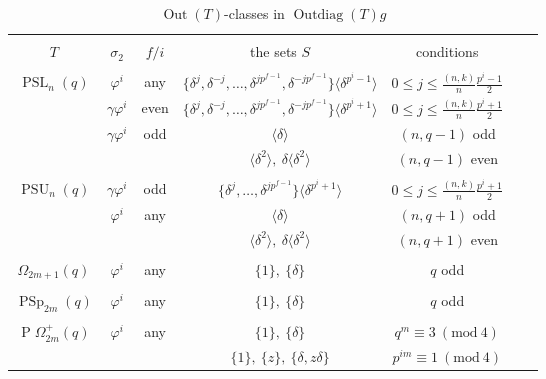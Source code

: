 \documentclass[11pt]{article}
\numberwithin{equation}{section}
\theoremstyle{shdefinition}
\theoremstyle{shplain}
\newcommand{\g}{\gamma}
\renewcommand{\d}{\delta}
\newcommand{\p}{\varphi}
\newcommand{\s}{\sigma}
\newcommand{\<}{\langle}
\renewcommand{\>}{\rangle}
\renewcommand{\leq}{\leqslant}
\newcommand{\Out}{\operatorname{Out}}
\newcommand{\Outdiag}{\operatorname{Outdiag}}
\renewcommand{\:}{\colon}
\renewcommand{\mod}[1]{\mathrm{ \ } (\mathrm{mod\ } #1)}
\newcommand{\PSL}{\operatorname{PSL}}
\newcommand{\PSp}{\operatorname{PSp}}
\newcommand{\PSU}{\operatorname{PSU}}
\newcommand{\Om}{\Omega}
\newcommand{\POm}{\operatorname{P}\!\Om}
\begin{document}
\begin{table}
\centering
\caption{$\Out(T)$-classes in $\Outdiag(T)g$} \label{tab:outdiag}
\begin{tabular}{ccccccc}
\hline\\[-9pt] 
$T$              & $\s_2$   & $f/i$      & the sets $S$                        & conditions                            \\[5.5pt]
\hline \\[-9pt] 
$\PSL_n(q)$      & $\p^i$   & any        & $\{\d^j,\d^{-j}, \dots,\d^{jp^{f-1}}, \d^{-jp^{f-1}}\}\<\d^{p^i-1}\>$ & $0 \leq j \leq \frac{(n,k)}{n}\frac{p^i-1}{2}$ \\[5.5pt]                
                 & $\g\p^i$ & even       & $\{\d^j,\d^{-j}, \dots,\d^{jp^{f-1}}, \d^{-jp^{f-1}}\}\<\d^{p^i+1}\>$ & $0 \leq j \leq \frac{(n,k)}{n}\frac{p^i+1}{2}$ \\[5.5pt] 
                 & $\g\p^i$ & odd        & $\<\d\>$                            & $(n,q-1)$ odd                         \\
                 &          &            & $\<\d^2\>,\ \d\<\d^2\>$             & $(n,q-1)$ even                        \\[5.5pt] 
\hline\\[-9pt]
$\PSU_n(q)$      & $\g\p^i$ & odd        & $\{\d^j, \dots, \d^{jp^{f-1}}\}\<\d^{p^i+1}\>$                        & $0 \leq j \leq \frac{(n,k)}{n}\frac{p^i+1}{2}$  \\[5.5pt]  
                 & $\p^i$   & any        & $\<\d\>$                            & $(n,q+1)$ odd                         \\
                 &          &            & $\<\d^2\>,\ \d\<\d^2\>$             & $(n,q+1)$ even                        \\[5.5pt] 
\hline\\[-9pt]
$\Om_{2m+1}(q)$  & $\p^i$   & any        & $\{ 1 \},\ \{ \d\}$                 & $q$ odd                               \\[5.5pt] 
\hline\\[-9pt]
$\PSp_{2m}(q)$   & $\p^i$   & any        & $\{ 1 \},\ \{ \d\}$                 & $q$ odd                               \\[5.5pt] 
\hline\\[-9pt]
$\POm^+_{2m}(q)$ & $\p^i$   & any        & $\{ 1 \},\ \{ \d \}$                & $q^m \equiv 3 \mod{4}$                \\
                 &          &            & $\{ 1 \},\ \{ z \},\ \{ \d, z\d \}$ & $p^{im} \equiv 1 \mod{4}$             \\

\end{tabular}
\end{table}
\end{document}
